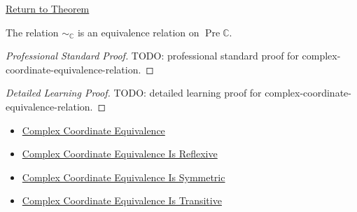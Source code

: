 \newpage
{}
\label{prf:complex-coordinate-equivalence-relation}

\begin{remark*}[Return]
\hyperref[thm:complex-coordinate-equivalence-relation]{Return to Theorem}
\end{remark*}

\begin{theorem*}
The relation $\sim_{\mathbb{C}}$ is an equivalence relation on
\(\operatorname{Pre}\mathbb{C}\).
\end{theorem*}

\begin{proof}[Professional Standard Proof]
\LRAProofBodyStart
TODO: professional standard proof for complex-coordinate-equivalence-relation.
\end{proof}

\begin{proof}[Detailed Learning Proof]
\LRAProofBodyStart
TODO: detailed learning proof for complex-coordinate-equivalence-relation.
\end{proof}

\begin{remark*}
\end{remark*}

\begin{dependencies}
\begin{itemize}
\item \hyperref[def:complex-coordinate-equivalence]{Complex Coordinate Equivalence}
  \item \hyperref[lem:complex-coordinate-equivalence-reflexive]{Complex Coordinate Equivalence Is Reflexive}
  \item \hyperref[lem:complex-coordinate-equivalence-symmetric]{Complex Coordinate Equivalence Is Symmetric}
  \item \hyperref[lem:complex-coordinate-equivalence-transitive]{Complex Coordinate Equivalence Is Transitive}
\end{itemize}
\end{dependencies}

\clearpage
